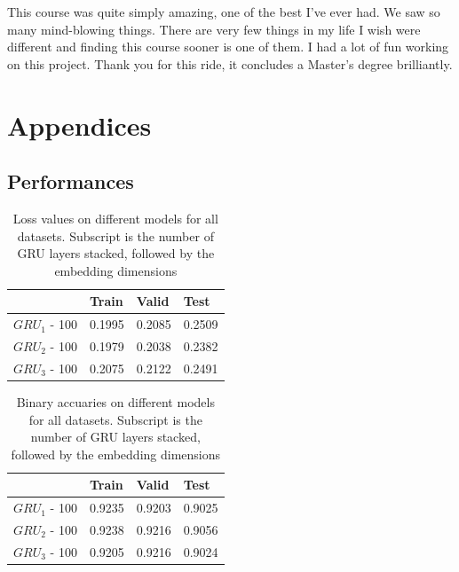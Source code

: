 \documentclass{article}
\begin{document}
This course was quite simply amazing, one of the best I've ever had. We saw so many mind-blowing things. There are very few things in my life I wish were different and finding this course sooner is one of them. I had a lot of fun working on this project. Thank you for this ride, it concludes a Master's degree brilliantly.

\newpage
\appendix

\section*{Appendices}
\renewcommand{\thesubsection}{\Alph{subsection}}
\subsection{Performances}
\label{performances}
\begin{table}[H]
\centering
\begin{tabular}{|l|c|c|c|}
\hline
\multicolumn{1}{|c|}{} & \multicolumn{1}{l|}{\textbf{Train}} & \multicolumn{1}{l|}{\textbf{Valid}} & \multicolumn{1}{l|}{\textbf{Test}} \\ \hline
$GRU_1$ - 100          & 0.1995                              & 0.2085                              & 0.2509                             \\ \hline
$GRU_2$ - 100          & 0.1979                              & 0.2038                              & 0.2382                             \\ \hline
$GRU_3$ - 100          & 0.2075                              & 0.2122                              & 0.2491                             \\ \hline
\end{tabular}
\caption{Loss values on different models for all datasets. Subscript is the number of GRU layers stacked, followed by the embedding dimensions}
\end{table}


\begin{table}[H]
\centering
\begin{tabular}{|l|c|c|c|}
\hline
\multicolumn{1}{|c|}{} & \multicolumn{1}{l|}{\textbf{Train}} & \multicolumn{1}{l|}{\textbf{Valid}} & \multicolumn{1}{l|}{\textbf{Test}} \\ \hline
$GRU_1$ - 100          & 0.9235                              & 0.9203                              & 0.9025                             \\ \hline
$GRU_2$ - 100          & 0.9238                              & 0.9216                              & 0.9056                             \\ \hline
$GRU_3$ - 100          & 0.9205                              & 0.9216                              & 0.9024                             \\ \hline
\end{tabular}
\caption{Binary accuaries on different models for all datasets. Subscript is the number of GRU layers stacked, followed by the embedding dimensions}
\end{table}
\end{document}
